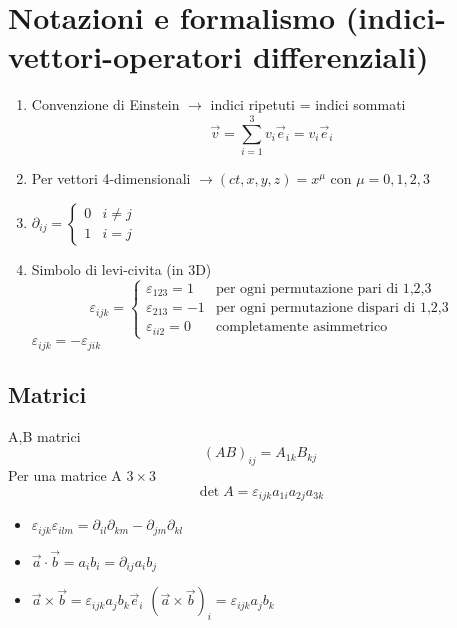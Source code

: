 \chapter{Notazioni e formalismo (indici-vettori-operatori differenziali)}

\begin{enumerate}
    \item Convenzione di Einstein $\rightarrow$ indici ripetuti = indici sommati
    \begin{equation*}
        \vec{v} = \sum_{i=1}^3 v_i\vec{e}_i = v_i\vec{e}_i
    \end{equation*}
    \item Per vettori 4-dimensionali $\rightarrow (ct,x,y,z) = x^\mu$ con $\mu =0,1,2,3$
    \item $\partial_{ij}=
    \begin{cases}
        0 & i \ne j \\
        1 & i = j 
    \end{cases}$
    \item Simbolo di levi-civita (in 3D)
    \begin{equation*}
        \varepsilon_{ijk} = 
            \begin{cases}
                \varepsilon_{123} = 1 & \text{per ogni permutazione pari di 1,2,3} \\
                \varepsilon_{213} = -1 & \text{per ogni permutazione dispari di 1,2,3} \\
                \varepsilon_{ii2} = 0 & \text{completamente asimmetrico}
            \end{cases}
    \end{equation*}
    $\varepsilon_{ijk} = - \varepsilon_{jik}$
\end{enumerate}

\section*{Matrici}
A,B matrici
\begin{equation*}
    {(AB)}_{ij} = A_{1k}B_{kj}
\end{equation*}
Per una matrice A $3 \times 3$ 
\begin{equation*}
    \det A = \varepsilon_{ijk} a_{1i}a_{2j}a_{3k}
\end{equation*}

\begin{itemize}
    \item $\varepsilon_{ijk}\varepsilon_{ilm} = \partial_{il}\partial_{km} - \partial_{jm}\partial_{kl}$
    \item $\vec{a}\cdot \vec{b} = a_ib_i = \partial_{ij}a_ib_j$
    \item $\vec{a}\times \vec{b} = \varepsilon_{ijk}a_jb_k\vec{e}_i$ \newline
    ${(\vec{a}\times \vec{b})}_i = \varepsilon_{ijk}a_jb_k$
\end{itemize}


